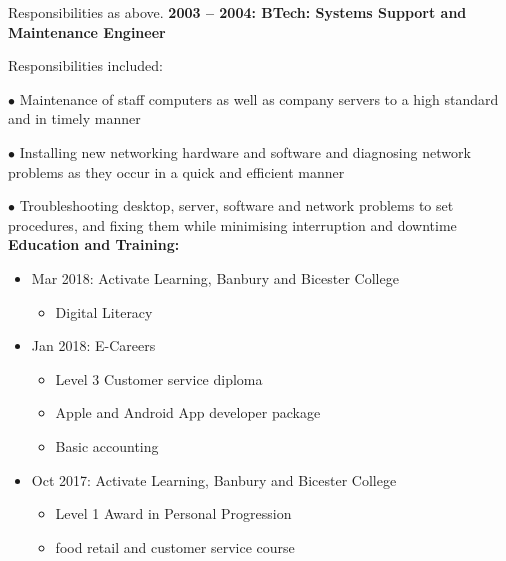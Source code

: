 \documentclass[10pt,a4paper]{book}
\begin{document}
\begin{flushleft}
Responsibilities as above.
\linebreak{}
\linebreak{}
\textbf {2003 -- 2004: BTech: Systems Support and Maintenance Engineer}
  
Responsibilities included:

  \item[$\bullet$]Maintenance of staff computers as well as company servers to a high standard and in timely manner

  \item[$\bullet$]Installing new networking hardware and software and diagnosing network problems as they occur in a quick and efficient manner

  \item[$\bullet$]Troubleshooting desktop, server, software and network problems to set procedures, and fixing them while minimising interruption and downtime
    \linebreak{}
\linebreak{}
\textbf {Education and Training:}
\begin{itemize}
  \item Mar 2018: Activate Learning, Banbury and Bicester College
    \begin{itemize}
    \item Digital Literacy
  \end{itemize}
\end{itemize}
\begin{itemize}
  \item Jan 2018: E-Careers
    \begin{itemize}
    \item Level 3 Customer service diploma

    \item Apple and Android App developer package

    \item Basic accounting
    \end{itemize}
    \end{itemize}
    \begin{itemize}
      \item Oct 2017: Activate Learning, Banbury and Bicester College
      \begin{itemize}
    \item Level 1 Award in Personal Progression

    \item food retail and customer service course


\end{itemize}
\end{itemize}
\end{flushleft}
\end{document}
